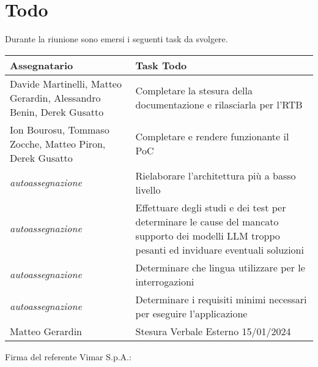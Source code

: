 \section{Todo}
Durante la riunione sono emersi i seguenti task da svolgere.

\begin{center}
  \begin{tabular}{|p{5cm}|p{8cm}|}
    \hline
    \textbf{Assegnatario}       & \textbf{Task Todo} \\ \hline
        Davide Martinelli, Matteo Gerardin, Alessandro Benin, Derek Gusatto & Completare la stesura della documentazione e rilasciarla per l'RTB \\ \hline
        Ion Bourosu, Tommaso Zocche, Matteo Piron, Derek Gusatto & Completare e rendere funzionante il PoC \\ \hline
        \textit{autoassegnazione} & Rielaborare l'architettura più a basso livello \\ \hline
        \textit{autoassegnazione} & Effettuare degli studi e dei test per determinare le cause del mancato supporto dei modelli LLM troppo pesanti ed inviduare eventuali soluzioni \\ \hline
        \textit{autoassegnazione} & Determinare che lingua utilizzare per le interrogazioni \\ \hline
        \textit{autoassegnazione} & Determinare i requisiti minimi necessari per eseguire l'applicazione \\ \hline
        Matteo Gerardin & Stesura Verbale Esterno 15/01/2024 \\ \hline
  \end{tabular}
\end{center}

\vspace{4cm}
\noindent Firma del referente Vimar S.p.A.: \underline{\hspace{5cm}}